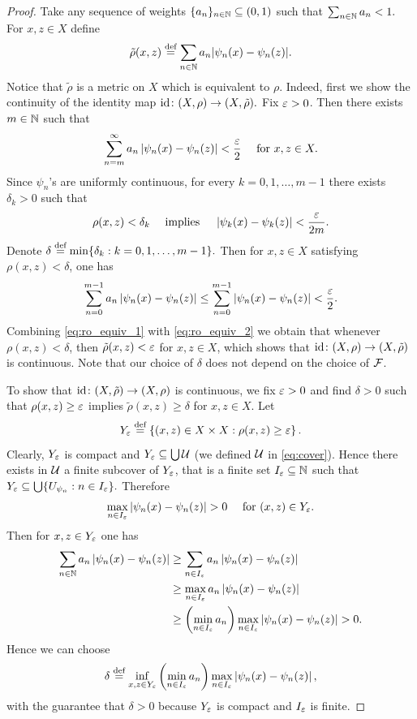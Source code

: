 \begin{proof}
Take any sequence of weights $\{a_n\}_{n\in\mathbb{N}}\subseteq (0,1)$ such that
$
\sum_{n\in\mathbb{N}} a_n<1.
$
For $x,z\in X$ define
\[
\tilde\rho(x,z)\stackrel{\textup{def}}{=}\sum_{n\in\mathbb{N}} a_n |\psi_n(x)-\psi_n(z)|.
\]
Notice that $\tilde\rho$ is a metric on $X$ which is equivalent to $\rho$. Indeed, first we show the continuity of the identity map
$\operatorname{id}\colon(X,\rho)\to(X,\tilde\rho).$
Fix $\varepsilon>0$. Then there exists $m\in\mathbb{N}$ such that 
\begin{equation}\label{eq:ro_equiv_1}
\sum_{n=m}^\infty a_n\left|\psi_n(x)-\psi_n(z) \right|<\frac{\varepsilon}{2} \quad\text{ for }x,z\in X.
\end{equation}
Since $\psi_n$'s are uniformly continuous, for every $k=0,1,\ldots ,m-1$ there exists $\delta_k>0$ such that 
\[
\rho(x,z)<\delta_k \quad \text{ implies }\quad \left|\psi_k(x)-\psi_k(z)\right|<\frac{\varepsilon}{2m}.
\]
Denote $\delta\stackrel{\textup{def}}{=}\min\{\delta_k:k=0,1,\ldots,m-1\}.$ Then for $x,z\in X$ satisfying $\rho(x,z)<\delta$, one has
\begin{equation}\label{eq:ro_equiv_2}
\sum_{n=0}^{m-1} a_n\left|\psi_n(x)-\psi_n(z) \right|\leq\sum_{n=0}^{m-1} \left|\psi_n(x)-\psi_n(z) \right|<\frac{\varepsilon}{2}.
\end{equation}
Combining \eqref{eq:ro_equiv_1} with \eqref{eq:ro_equiv_2} we obtain that whenever $\rho(x,z)<\delta$, then $\tilde\rho(x,z)<\varepsilon$ for $x,z\in X$, which shows that $\operatorname{id}\colon(X,\rho)\to(X,\tilde\rho)$ is continuous. Note that our choice of $\delta$ does not depend on the choice of $\operatorname{\mathcal{F}}$. 

To show that $\operatorname{id}\colon(X,\tilde\rho)\to(X,\rho)$ is continuous, we fix $\varepsilon>0$ and find $\delta>0$ such that $\rho(x,z)\geq\varepsilon$ implies $\tilde\rho(x,z)\geq\delta$ for $x,z\in X$. Let
\[
Y_{\varepsilon}\stackrel{\textup{def}}{=} \left\{(x,z)\in X\times X: \rho(x,z)\geq \varepsilon\right\}.
\]
Clearly, $Y_{\varepsilon}$ is compact and $Y_{\varepsilon}\subseteq\bigcup \operatorname{\mathcal{U}}$ (we defined $\operatorname{\mathcal{U}}$ in \eqref{eq:cover}).  Hence there exists in $\operatorname{\mathcal{U}}$ a finite subcover of $Y_{\varepsilon}$, that is a finite set 
$I_{\varepsilon}\subseteq \mathbb{N}$ such that $Y_{\varepsilon}\subseteq\bigcup\{U_{\psi_n}:n\in I_{\varepsilon}\}.$ Therefore
\[
\max_{n\in I_{\varepsilon}}\left|\psi_n(x)-\psi_n(z) \right| > 0 \quad\text{ for } (x,z)\in Y_{\varepsilon}.
\]
Then for $x,z\in Y_{\varepsilon}$ one has
\begin{align*}
\sum_{n\in\N} a_n\inmodul{\psi_n(x)-\psi_n(z) }&\geq \sum_{n\in I_{\eps}} a_n\inmodul{\psi_n(x)-\psi_n(z) } \\
&\geq\max_{n\in I_{\eps}} a_n \inmodul{\psi_n(x)-\psi_n(z) }\\
&\geq \inparen{ \min_{n\in I_{\eps}}a_n}\max_{n\in I_{\eps}}\inmodul{\psi_n(x)-\psi_n(z) }>0.
\end{align*}
Hence we can choose
\[
\delta\stackrel{\textup{def}}{=} \inf_{x,z\in Y_\varepsilon} \left( \min_{n\in I_{\varepsilon}}a_n\right)\max_{n\in I_{\varepsilon}}\left|\psi_n(x)-\psi_n(z) \right|,
\]
with the guarantee that $\delta>0$ because $Y_\varepsilon$ is compact and $I_\varepsilon$ is finite.


\end{proof}
